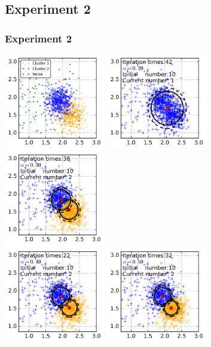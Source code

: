 \documentclass{beamer}
\begin{document}
\subsection{Experiment 2}


\begin{frame}
  \frametitle{Experiment 2}
  \includegraphics[width=0.33\textwidth]{img/example_close_cluster_ori.png}
  \includegraphics[width=0.33\textwidth]{img/example_close_cluster_last_frame_n_10_alpha_0_2.png}
  \includegraphics[width=0.33\textwidth]{img/example_close_cluster_last_frame_n_10_alpha_0_3.png}
  \\
  \includegraphics[width=0.33\textwidth]{img/example_close_cluster_last_frame_n_10_alpha_0_4.png}
  \includegraphics[width=0.33\textwidth]{img/example_close_cluster_last_frame_n_10_alpha_0_5.png}

\end{frame}
\end{document}
